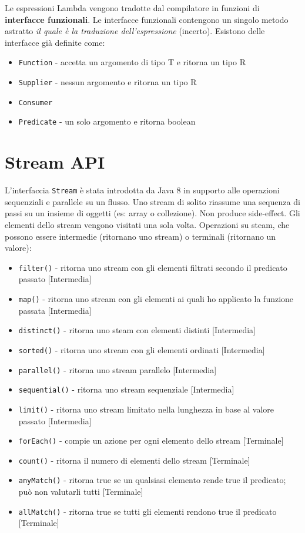 Le espressioni Lambda vengono tradotte dal compilatore in funzioni di \textbf{interfacce funzionali}. Le interfacce funzionali contengono un singolo metodo astratto \textit{il quale è la traduzione dell'espressione} (incerto). Esistono delle interfacce già definite come:
\begin{itemize}
\item \texttt{Function} - accetta un argomento di tipo T e ritorna un tipo R
\item \texttt{Supplier} - nessun argomento e ritorna un tipo R
\item \texttt{Consumer} 
\item \texttt{Predicate} - un solo argomento e ritorna boolean 
\end{itemize}

\section{Stream API}
L'interfaccia \texttt{Stream} è stata introdotta da Java 8 in supporto alle operazioni sequenziali e parallele su un flusso. Uno stream di solito riassume una sequenza di passi su un insieme di oggetti (es: array o collezione). Non produce side-effect. Gli elementi dello stream vengono visitati una sola volta. Operazioni su steam, che possono essere intermedie (ritornano uno stream) o terminali (ritornano un valore):
\begin{itemize}
\item \texttt{filter()} - ritorna uno stream con gli elementi filtrati secondo il predicato passato [Intermedia]
\item \texttt{map()} - ritorna uno stream con gli elementi ai quali ho applicato la funzione passata [Intermedia]
\item \texttt{distinct()} - ritorna uno steam con elementi distinti [Intermedia]
\item \texttt{sorted()} - ritorna uno stream con gli elementi ordinati [Intermedia]
\item \texttt{parallel()} - ritorna uno stream parallelo [Intermedia]
\item \texttt{sequential()} - ritorna uno stream sequenziale [Intermedia]
\item \texttt{limit()} - ritorna uno stream limitato nella lunghezza in base al valore passato [Intermedia]
\item \texttt{forEach()} - compie un azione per ogni elemento dello stream [Terminale]
\item \texttt{count()} - ritorna il numero di elementi dello stream [Terminale]
\item \texttt{anyMatch()} - ritorna true se un qualsiasi elemento rende true il predicato; può non valutarli tutti [Terminale]
\item \texttt{allMatch()} - ritorna true se tutti gli elementi rendono true il predicato [Terminale]
\end{itemize}
